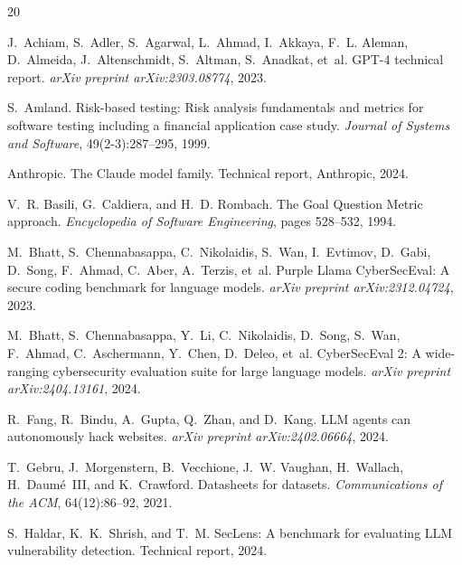 \documentclass[10pt,twocolumn]{article}
\begin{document}
\begin{thebibliography}{20}

J.~Achiam, S.~Adler, S.~Agarwal, L.~Ahmad, I.~Akkaya, F.~L. Aleman, D.~Almeida, J.~Altenschmidt, S.~Altman, S.~Anadkat, et~al.
\newblock GPT-4 technical report.
\newblock \emph{arXiv preprint arXiv:2303.08774}, 2023.

S.~Amland.
\newblock Risk-based testing: Risk analysis fundamentals and metrics for software testing including a financial application case study.
\newblock \emph{Journal of Systems and Software}, 49(2-3):287--295, 1999.

Anthropic.
\newblock The Claude model family.
\newblock Technical report, Anthropic, 2024.

V.~R. Basili, G.~Caldiera, and H.~D. Rombach.
\newblock The Goal Question Metric approach.
\newblock \emph{Encyclopedia of Software Engineering}, pages 528--532, 1994.

M.~Bhatt, S.~Chennabasappa, C.~Nikolaidis, S.~Wan, I.~Evtimov, D.~Gabi, D.~Song, F.~Ahmad, C.~Aber, A.~Terzis, et~al.
\newblock Purple Llama CyberSecEval: A secure coding benchmark for language models.
\newblock \emph{arXiv preprint arXiv:2312.04724}, 2023.

M.~Bhatt, S.~Chennabasappa, Y.~Li, C.~Nikolaidis, D.~Song, S.~Wan, F.~Ahmad, C.~Aschermann, Y.~Chen, D.~Deleo, et~al.
\newblock CyberSecEval 2: A wide-ranging cybersecurity evaluation suite for large language models.
\newblock \emph{arXiv preprint arXiv:2404.13161}, 2024.

R.~Fang, R.~Bindu, A.~Gupta, Q.~Zhan, and D.~Kang.
\newblock LLM agents can autonomously hack websites.
\newblock \emph{arXiv preprint arXiv:2402.06664}, 2024.

T.~Gebru, J.~Morgenstern, B.~Vecchione, J.~W. Vaughan, H.~Wallach, H.~Daum{\'e}~III, and K.~Crawford.
\newblock Datasheets for datasets.
\newblock \emph{Communications of the ACM}, 64(12):86--92, 2021.

S.~Haldar, K.~K.~Shrish, and T.~M.
\newblock SecLens: A benchmark for evaluating LLM vulnerability detection.
\newblock Technical report, 2024.


\end{thebibliography}
\end{document}
